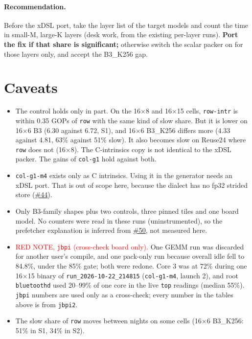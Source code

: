 \documentclass[10pt,a4paper]{article}
\newcommand{\iss}[1]{\href{https://github.com/JieGH/RVV_code_gen_via_MLIR_xDSL/issues/#1}{\##1}}
\newcommand{\key}[1]{\textbf{\textcolor{blue!55!black}{#1}}}  %
\begin{document}
\paragraph{Recommendation.} Before the xDSL port, take the layer list of the target models and count the time in small-M,
large-K layers (desk work, from the existing per-layer runs). \key{Port the fix if that share is significant;} otherwise switch the scalar
packer on for those layers only, and accept the B3\_K256 gap.

\section{Caveats}
\begin{itemize}
  \item The control holds only in part. On the 16$\times$8 and 16$\times$15 cells, \texttt{row-intr} is within 0.35 GOPs of \texttt{row}
  with the same kind of slow share. But it is lower on 16$\times$6 B3 (6.30 against 6.72, S1), and 16$\times$6 B3\_K256 differs more
  (4.33 against 4.81, 63\% against 51\% slow). It also becomes slow on Reuse24 where \texttt{row} does not (16$\times$8). The C-intrinsics
  copy is not identical to the xDSL packer. The gains of \texttt{col-g1} hold against both.
  \item \texttt{col-g1-m4} exists only as C intrinsics. Using it in the generator needs an xDSL port. That is out of scope here, because the
  dialect has no fp32 strided store (\iss{44}).
  \item Only B3-family shapes plus two controls, three pinned tiles and one board model. No counters were read in these runs
  (uninstrumented), so the prefetcher explanation is inferred from \iss{50}, not measured here.
  \item \textcolor{red}{RED NOTE, \texttt{jbpi} (cross-check board only).} One GEMM run was discarded for another user's compile, and one pack-only
  run because overall idle fell to 84.8\%, under the 85\% gate; both were redone. Core 3 was at 72\% during one 16$\times$15 binary of \texttt{run\_2026-10-22\_214815} (\texttt{col-g1-m4}, launch 2),
  and root \texttt{bluetoothd} used 20--99\% of one core in the live \texttt{top} readings (median 55\%). \texttt{jbpi} numbers are used only as a cross-check; every number in the
  tables above is from \texttt{jbpi2}.
  \item The slow share of \texttt{row} moves between nights on some cells (16$\times$6 B3\_K256: 51\% in S1, 34\% in S2).
\end{itemize}
\end{document}

